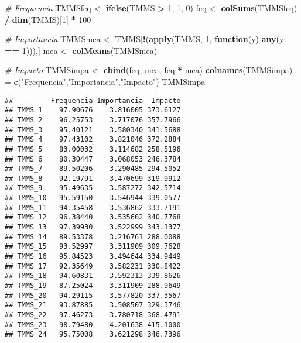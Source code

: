 \documentclass[
  10pt,
  spanish,
]{article}
\newenvironment{Shaded}{\begin{snugshade}}{\end{snugshade}}
\newcommand{\CommentTok}[1]{\textcolor[rgb]{0.56,0.35,0.01}{\textit{#1}}}
\newcommand{\ControlFlowTok}[1]{\textcolor[rgb]{0.13,0.29,0.53}{\textbf{#1}}}
\newcommand{\DecValTok}[1]{\textcolor[rgb]{0.00,0.00,0.81}{#1}}
\newcommand{\KeywordTok}[1]{\textcolor[rgb]{0.13,0.29,0.53}{\textbf{#1}}}
\newcommand{\NormalTok}[1]{#1}
\newcommand{\OperatorTok}[1]{\textcolor[rgb]{0.81,0.36,0.00}{\textbf{#1}}}
\newcommand{\StringTok}[1]{\textcolor[rgb]{0.31,0.60,0.02}{#1}}
\begin{document}
\begin{Shaded}
\begin{Highlighting}[]
\CommentTok{# Frequencia}
\NormalTok{TMMSfeq <-}\StringTok{ }\KeywordTok{ifelse}\NormalTok{(TMMS }\OperatorTok{>}\StringTok{ }\DecValTok{1}\NormalTok{, }\DecValTok{1}\NormalTok{, }\DecValTok{0}\NormalTok{)}
\NormalTok{feq <-}\StringTok{ }\KeywordTok{colSums}\NormalTok{(TMMSfeq) }\OperatorTok{/}\StringTok{ }\KeywordTok{dim}\NormalTok{(TMMS)[}\DecValTok{1}\NormalTok{] }\OperatorTok{*}\StringTok{ }\DecValTok{100}

\CommentTok{# Importancia}
\NormalTok{TMMSmea <-}\StringTok{ }\NormalTok{TMMS[}\OperatorTok{!}\NormalTok{(}\KeywordTok{apply}\NormalTok{(TMMS, }\DecValTok{1}\NormalTok{, }\ControlFlowTok{function}\NormalTok{(y) }\KeywordTok{any}\NormalTok{(y }\OperatorTok{==}\StringTok{ }\DecValTok{1}\NormalTok{))),]}
\NormalTok{mea <-}\StringTok{ }\KeywordTok{colMeans}\NormalTok{(TMMSmea)}

\CommentTok{# Impacto}
\NormalTok{TMMSimpa <-}\StringTok{ }\KeywordTok{cbind}\NormalTok{(feq, mea, feq }\OperatorTok{*}\StringTok{ }\NormalTok{mea)}
\KeywordTok{colnames}\NormalTok{(TMMSimpa) =}\StringTok{ }\KeywordTok{c}\NormalTok{(}\StringTok{"Frequencia"}\NormalTok{,}\StringTok{"Importancia"}\NormalTok{,}\StringTok{"Impacto"}\NormalTok{)}
\NormalTok{TMMSimpa}
\end{Highlighting}
\end{Shaded}

\begin{verbatim}
##         Frequencia Importancia  Impacto
## TMMS_1    97.90676    3.816005 373.6127
## TMMS_2    96.25753    3.717076 357.7966
## TMMS_3    95.40121    3.580340 341.5688
## TMMS_4    97.43102    3.821046 372.2884
## TMMS_5    83.00032    3.114682 258.5196
## TMMS_6    80.30447    3.068053 246.3784
## TMMS_7    89.50206    3.290485 294.5052
## TMMS_8    92.19791    3.470699 319.9912
## TMMS_9    95.49635    3.587272 342.5714
## TMMS_10   95.59150    3.546944 339.0577
## TMMS_11   94.35458    3.536862 333.7191
## TMMS_12   96.38440    3.535602 340.7768
## TMMS_13   97.39930    3.522999 343.1377
## TMMS_14   89.53378    3.216761 288.0088
## TMMS_15   93.52997    3.311909 309.7628
## TMMS_16   95.84523    3.494644 334.9449
## TMMS_17   92.35649    3.582231 330.8422
## TMMS_18   94.60831    3.592313 339.8626
## TMMS_19   87.25024    3.311909 288.9649
## TMMS_20   94.29115    3.577820 337.3567
## TMMS_21   93.87885    3.508507 329.3746
## TMMS_22   97.46273    3.780718 368.4791
## TMMS_23   98.79480    4.201638 415.1000
## TMMS_24   95.75008    3.621298 346.7396
\end{verbatim}
\end{document}
